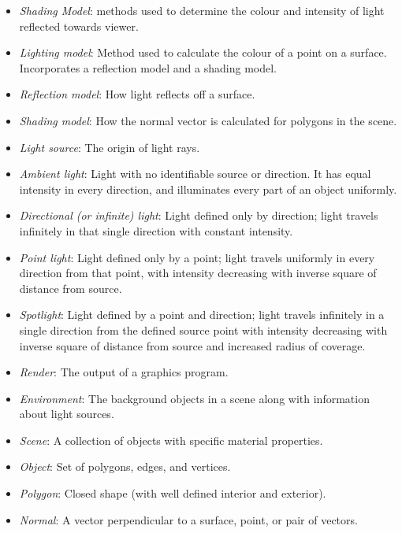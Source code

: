 \documentclass[12pt]{article}
\begin{document}
\begin{itemize}
\item[\label{}] \textit{Shading Model}: methods used to determine the colour 
and intensity of light reflected towards viewer. 
\item[\label{}]\textit{Lighting model}: Method used to calculate the colour of 
a point on a surface. Incorporates a reflection model and a shading model. 
\item[\label{}] \textit{Reflection model}: How light reflects off a surface. 
\item[\label{}] \textit{Shading model}: How the normal vector is calculated for 
polygons in the scene.
\item[\label{}] \textit{Light source}: The origin of light rays.
\item[\label{}] \textit{Ambient light}: Light with no identifiable source or 
direction. It has equal intensity in every direction, and illuminates every 
part of an object uniformly.
\item[\label{}] \textit{Directional (or infinite) light}: Light defined only by 
direction; light travels infinitely in that single direction with constant 
intensity. 
\item[\label{}] \textit{Point light}: Light defined only by a point; light 
travels uniformly in every direction from that point, with intensity decreasing 
with inverse square of distance from source. 
\item[\label{}] \textit{Spotlight}: Light defined by a point and direction; 
light travels infinitely in a single direction from the defined source point 
with intensity decreasing with inverse square of distance from source and 
increased radius of coverage.
\item[\label{}] \textit{Render}: The output of a graphics program.
\item[\label{}] \textit{Environment}: The background objects in a scene along 
with information about light sources.
\item[\label{}] \textit{Scene}: A collection of objects with specific material 
properties. 
\item[\label{}] \textit{Object}: Set of polygons, edges, and vertices. 
\item[\label{}] \textit{Polygon}: Closed shape (with well defined interior and 
exterior).
\item[\label{}] \textit{Normal}: A vector perpendicular to a surface, point, or 
pair of 
vectors.


\end{itemize}
\end{document}
